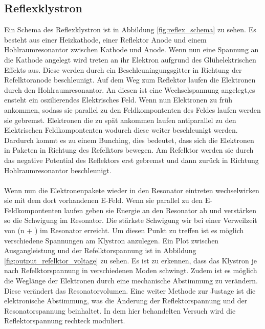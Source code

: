\subsection{Reflexklystron}
Ein Schema des Reflexklystron ist in Abbildung \ref{fig:reflex_schema} zu sehen.
Es besteht aus einer Heizkathode, einer Reflektor Anode und einem Hohlraumresonantor zwischen Kathode und Anode.
Wenn nun eine Spannung an die Kathode angelegt wird treten an ihr Elektron aufgrund des Glühelektrischen Effekts aus.
Diese werden durch ein Beschleuningungsgitter in Richtung der Refelktoranode beschleunigt.
Auf dem Weg zum Reflektor laufen die Elektronen durch den Hohlraumresonantor.
An diesen ist eine Wechselspannung angelegt,es ensteht ein oszilierendes Elektrisches Feld.
Wenn nun Elektronen zu früh ankommen, sodass sie parallel zu den Feldkompontenten des Feldes laufen werden sie gebremst.
Elektronen die zu spät ankommen laufen antiparallel zu den Elektrischen Feldkompontenten wodurch diese weiter beschleunigt werden.
Dardurch kommt es zu einem Bunching, dies bedeutet, dass sich die Elektronen in Paketen in Richtung des Refelktors bewegen.
Am Refelktor werden sie durch das negative Potential des Reflektors erst gebremst und dann zurück in Richtung Hohlraumresonantor beschleunigt.
\\\\
Wenn nun die Elektronenpakete wieder in den Resonator eintreten wechselwirken sie mit dem dort vorhandenen E-Feld.
Wenn sie parallel zu den E-Feldkompontenten laufen geben sie Energie an den Resonator ab und verstärken so die Schwigung im Resonator.
Die stärkste Schwigung wir bei einer Verweilzeit von (n + ) im Resonator erreicht.
Um diesen Punkt zu treffen ist es möglich verschiedene Spannungen am Klystron anzulegen.
Ein Plot zwischen Ausgangleistung und der Refelktorspannung ist in Abbildung \ref{fig:output_refelktor_voltage} zu sehen.
Es ist zu erkennen, dass das Klystron je nach Refelktorspannung in verschiedenen Moden schwingt.
Zudem ist es möglich die Weglänge der Elektronen durch eine mechanische Abstimmung zu verändern.
Diese verändert das Resonatorvolumen.
Eine weiter Methode zur Justage ist die elektronische Abstimmung, was die Änderung der Reflektorspannung und der Resonatorspannung beinhaltet.
In dem hier behandelten Versuch wird die Reflektorspannung rechteck moduliert.
\\\\
